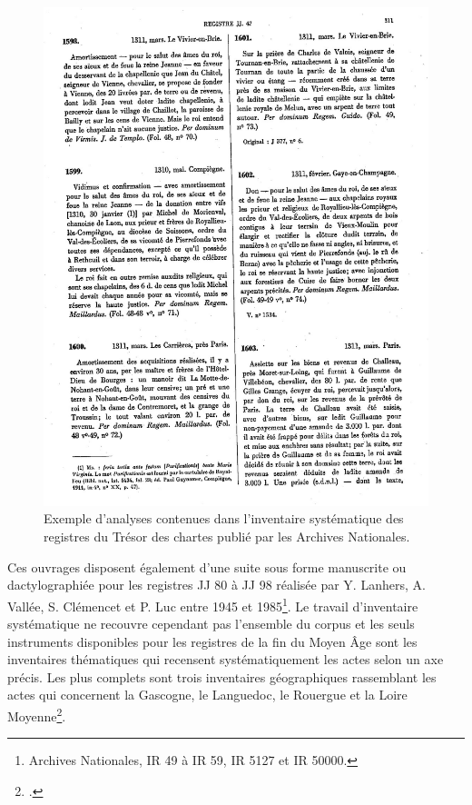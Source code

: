 \documentclass[a4paper,12pt,twoside]{book}
\begin{document}
	\begin{figure}
		\centering
		\includegraphics[width=\textwidth]{Images/Inventaire_papier.jpg}
		\caption{Exemple d'analyses contenues dans l'inventaire systématique des registres du Trésor des chartes publié par les Archives Nationales.}
		\label{inventaire_papier}
	\end{figure}
	
	Ces ouvrages disposent également d'une suite sous forme manuscrite ou dactylographiée pour les registres JJ 80 à JJ 98 réalisée par Y. Lanhers, A. Vallée, S. Clémencet et P. Luc entre 1945 et 1985\footnote{Archives Nationales, IR 49 à IR 59, IR 5127 et IR 50000.}. Le travail d'inventaire systématique ne recouvre cependant pas l'ensemble du corpus et les seuls instruments disponibles pour les registres de la fin du Moyen Âge sont les inventaires thématiques qui recensent systématiquement les actes selon un axe précis. Les plus complets sont trois inventaires géographiques rassemblant les actes qui concernent la Gascogne, le Languedoc, le Rouergue et la Loire Moyenne\footcite{samaran_gascogne_1966, dossat_languedoc_1983, chevalier_les_1993}.
	
\end{document}

